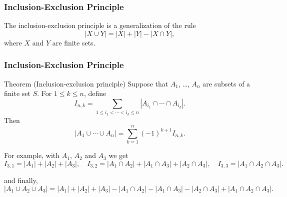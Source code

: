 \documentclass{beamer}
\begin{document}
\begin{frame}%
\frametitle{Inclusion-Exclusion Principle}


The inclusion-exclusion principle  is a generalization of the rule
$$
|X\cup Y| = |X| + |Y| - |X\cap Y|,
$$
where $X$ and $Y$ are finite sets.


\end{frame}

\begin{frame}%
\frametitle{Inclusion-Exclusion Principle}
\scriptsize
\begin{block}{Theorem (Inclusion-exclusion principle)}
Suppose that $A_1$, \ldots, $A_n$ are subsets of a finite set $S$. For $1 \le k \le n$, define
$$
I_{n,k} = \sum_{1 \le i_1 < \cdots < i_k \le n} |A_{i_1} \cap \cdots \cap A_{i_k}|.
$$
Then
$$
|A_1 \cup \cdots \cup A_n| = \sum_{k = 1}^n (-1)^{k+1}I_{n,k}.
$$
\end{block}


For example, with $A_1$, $A_2$ and $A_3$ we get
$$
I_{3,1} = |A_1| + |A_2| + |A_3|, \quad I_{3,2} = |A_1 \cap A_2| + |A_1 \cap A_3| + |A_2 \cap A_3|, \quad I_{3,3} = |A_1 \cap A_2 \cap A_3|.
$$

\vspace{0.2cm}
and finally,
$$
|A_1\cup A_2\cup A_3| = |A_1| + |A_2| + |A_3| - |A_1 \cap A_2| - |A_1 \cap A_3| - |A_2 \cap A_3| + |A_1 \cap A_2 \cap A_3|.
$$
\end{frame}

\end{document}
